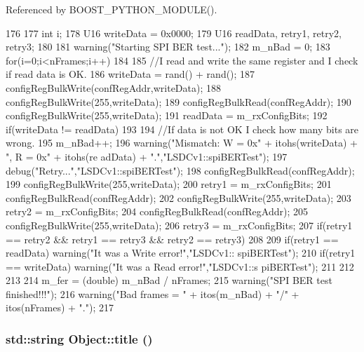 Referenced by BOOST\_\-PYTHON\_\-MODULE().


\begin{DoxyCode}
176 {
177     int i;
178     U16 writeData = 0x0000;
179     U16 readData, retry1, retry2, retry3;
180 
181     warning("Starting SPI BER test...");
182     m_nBad = 0;
183     for(i=0;i<nFrames;i++)
184     {
185         //I read and write the same register and I check if read data is OK.
186         writeData = rand() + rand();    
187         configRegBulkWrite(confRegAddr,writeData);
188 configRegBulkWrite(255,writeData);
189         configRegBulkRead(confRegAddr); 
190 configRegBulkWrite(255,writeData);
191         readData = m_rxConfigBits;
192         if(writeData != readData)
193         {
194             //If data is not OK I check how many bits are wrong.
195             m_nBad++;
196             warning("Mismatch: W = 0x" + itohs(writeData) + ", R = 0x" + itohs(re
      adData) + ".","LSDCv1::spiBERTest");
197             debug("Retry...","LSDCv1::spiBERTest");
198             configRegBulkRead(confRegAddr);
199 configRegBulkWrite(255,writeData);          
200             retry1 = m_rxConfigBits;
201             configRegBulkRead(confRegAddr);
202 configRegBulkWrite(255,writeData);          
203             retry2 = m_rxConfigBits;
204             configRegBulkRead(confRegAddr);
205 configRegBulkWrite(255,writeData);          
206             retry3 = m_rxConfigBits;            
207             if(retry1 == retry2 && retry1 == retry3 && retry2 == retry3)
208             {
209                 if(retry1 == readData)  warning("It was a Write error!","LSDCv1::
      spiBERTest");          
210                 if(retry1 == writeData) warning("It was a Read error!","LSDCv1::s
      piBERTest");          
211             } 
212         }
213     }
214     m_fer = (double) m_nBad / nFrames;
215     warning("SPI BER test finished!!!");
216     warning("Bad frames = " + itos(m_nBad) + "/" + itos(nFrames) + ".");
217 }
\end{DoxyCode}
\hypertarget{classObject_a73a0f1a41828fdd8303dd662446fb6c3}{
\subsubsection[{title}]{\setlength{\rightskip}{0pt plus 5cm}std::string Object::title ()}}
\label{classObject_a73a0f1a41828fdd8303dd662446fb6c3}


